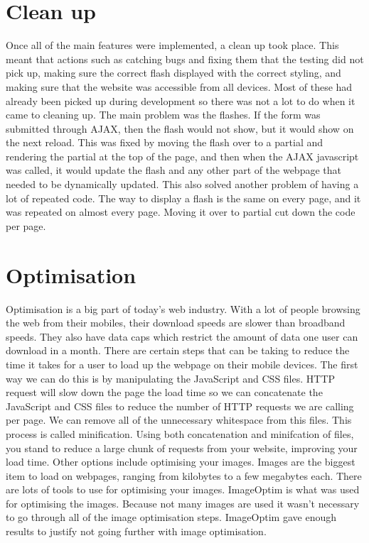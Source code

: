\section{Clean up}
Once all of the main features were implemented, a clean up took place. This meant that actions such as catching bugs and fixing them that the testing did not pick up, making sure the correct flash displayed with the correct styling, and making sure that the website was accessible from all devices. Most of these had already been picked up during development so there was not a lot to do when it came to cleaning up. The main problem was the flashes. If the form was submitted through AJAX, then the flash would not show, but it would show on the next reload. This was fixed by moving the flash over to a partial and rendering the partial at the top of the page, and then when the AJAX javascript was called, it would update the flash and any other part of the webpage that needed to be dynamically updated. This also solved another problem of having a lot of repeated code. The way to display a flash is the same on every page, and it was repeated on almost every page. Moving it over to partial cut down the code per page.\\

\section{Optimisation}
Optimisation is a big part of today's web industry. With a lot of people browsing the web from their mobiles, their download speeds are slower than broadband speeds. They also have data caps which restrict the amount of data one user can download in a month. There are certain steps that can be taking to reduce the time it takes for a user to load up the webpage on their mobile devices. The first way we can do this is by manipulating the JavaScript and CSS files. HTTP request will slow down the page the load time so we can concatenate the JavaScript and CSS files to reduce the number of HTTP requests we are calling per page. We can remove all of the unnecessary whitespace from this files. This process is called minification. Using both concatenation and minifcation of files, you stand to reduce a large chunk of requests from your website, improving your load time. Other options include optimising your images. Images are the biggest item to load on webpages, ranging from kilobytes to a few megabytes each. There are lots of tools to use for optimising your images. ImageOptim \citep{imageoptim:2014} is what was used for optimising the images. Because not many images are used it wasn't necessary to go through all of the image optimisation steps. ImageOptim gave enough results to justify not going further with image optimisation.\\


